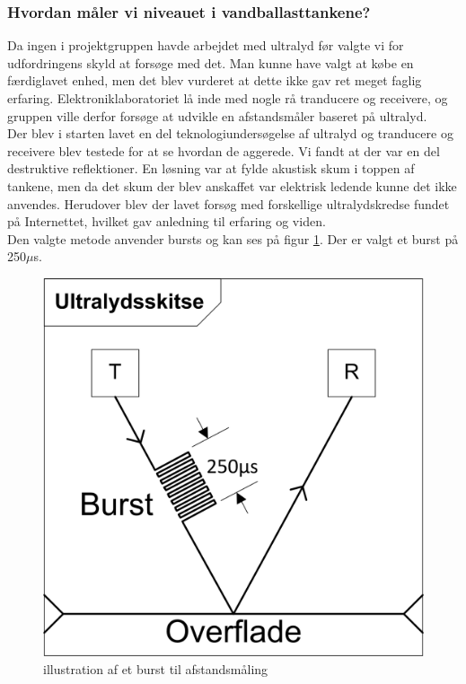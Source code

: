 \subsubsection{Hvordan måler vi niveauet i vandballasttankene?}
Da ingen i projektgruppen havde arbejdet med ultralyd før valgte vi for udfordringens skyld at forsøge med det. Man kunne have valgt at købe en færdiglavet enhed, men det blev vurderet at dette ikke gav ret meget faglig erfaring. Elektroniklaboratoriet lå inde med nogle rå tranducere og receivere, og gruppen ville derfor forsøge at udvikle en afstandsmåler baseret på ultralyd.\\ 
Der blev i starten lavet en del teknologiundersøgelse af ultralyd og tranducere og receivere blev testede for at se hvordan de aggerede. Vi fandt at der var en del destruktive reflektioner. En løsning var at fylde akustisk skum i toppen af tankene, men da det skum der blev anskaffet var elektrisk ledende kunne det ikke anvendes. Herudover blev der lavet forsøg med forskellige ultralydskredse fundet på Internettet, hvilket gav anledning til erfaring og viden. \\
Den valgte metode anvender bursts og kan ses på figur \ref{fig:bursts}. Der er valgt et burst på 250$\mu$s.\\
\begin{figure}[H]
\centering
\includegraphics[width=.3\textwidth]{billeder/ultralydsburst}
\caption{illustration af et burst til afstandsmåling}
\label{fig:bursts}
\end{figure}

